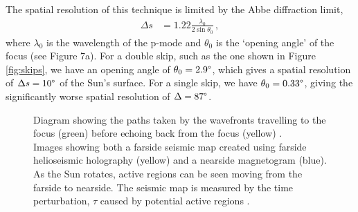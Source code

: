\documentclass[11pt,a4paper,onecolumn]{report}
\begin{document}
\noindent The spatial resolution of this technique is limited by the Abbe
diffraction limit,
\begin{align}
  \Delta s &= 1.22\frac{\lambda_0}{2 \sin{\theta_0}}\,,
\end{align}
where \(\lambda_0\) is the wavelength of the p-mode and \(\theta_0\) is the
`opening angle' of the focus (see Figure 7a). For a double skip,
such as the one shown in Figure \ref{fig:skips}, we have an opening angle of
\(\theta_0 =2.9\degree\), which gives a spatial resolution of \(\Delta s =
10\degree\) of the Sun's surface. For a single skip, we have \(\theta_0
=0.33\degree\), giving the significantly worse spatial resolution of \(\Delta =
87\degree\). \\

\begin{figure}[t]%
  \centering
  \qquad
  \caption[]{
     Diagram showing the paths taken by the wavefronts
    travelling to the focus (green) before echoing back from the focus (yellow)
    \citep{Lindsey2011}.\\
     Images showing both a farside seismic map created using
    farside helioseismic holography (yellow) and a nearside magnetogram (blue).
    As the Sun rotates, active regions can be seen moving from the farside to
    nearside. The seismic map is measured by the time perturbation, \(\tau\) caused by
    potential active regions \citep{Lindsey2017}.
    }
\end{figure}
\end{document}
